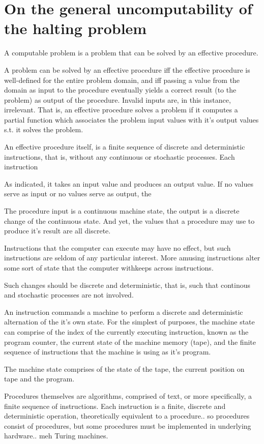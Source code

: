 \chapter{On the general uncomputability of the halting problem}

A computable problem is a problem that can be solved by an effective procedure.

A problem can be solved by an effective procedure iff the effective procedure
is well-defined for the entire problem domain, and iff passing a value from the
domain as input to the procedure eventually yields a correct result (to the
problem) as output of the procedure. Invalid inputs are, in this instance,
irrelevant. That is, an effective procedure solves a problem if it computes a
partial function which associates the problem input values with it's output
values s.t. it solves the problem.

An effective procedure itself, is a finite sequence of discrete and
deterministic instructions, that is, without any continuous or stochastic
processes. Each instruction 

As indicated, it takes an input value and produces an output
value. If no values serve as input or no values serve as output, the

The procedure input is a continuous machine state, the output is a discrete
change of the continuous state. And yet, the values that a procedure may use to
produce it's result are all discrete.

Instructions that the computer can execute may have no effect, but such
instructions are seldom of any particular interest. More amusing instructions
alter some sort of state that the computer withkeeps across instructions.

Such changes should be discrete and deterministic, that is, such that continous
and stochastic processes are not involved.

An instruction
commands a machine to perform a discrete and deterministic alternation of the
it's own state. For the simplest of purposes, the machine state can comprise of
the index of the currently executing instruction, known as the program counter,
the current state of the machine memory (tape), and the finite sequence of
instructions that the machine is using as it's program.

The machine state comprises of the state of the tape, the current position on
tape and the program.

Procedures themselves are algorithms, comprised of text, or more specifically,
a finite sequence of instructions. Each instruction is a finite, discrete and
deterministic operation, theoretically equivalent to a procedure.. so
procedures consist of procedures, but some procedures must be implemented in
underlying hardware.. meh Turing machines.


